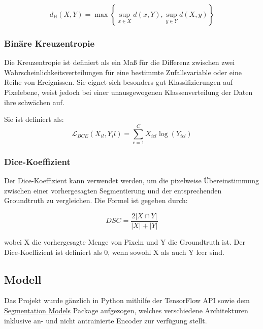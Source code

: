 \begin{equation}
d_{\mathrm{H}}(X, Y)=\max \left\{\sup _{x \in X} d(x, Y), \sup _{y \in Y} d(X, y)\right\}
\end{equation}

\subsubsection{Binäre Kreuzentropie} \label{ssec:bce}

Die Kreuzentropie ist definiert als ein Maß für die Differenz zwischen zwei Wahrscheinlichkeitsverteilungen für eine bestimmte Zufallsvariable oder eine Reihe von Ereignissen. Sie eignet sich besonders gut Klassifizierungen auf Pixelebene, weist jedoch bei einer unausgewogenen Klassenverteilung der Daten ihre schwächen auf. \citet{Jadon_2020} 

Sie ist definiert als:
\begin{equation}
\mathcal{L}_{BCE}\left(X_{i l}, Y_{i} l\right)=\sum_{c=1}^{C} X_{i c l} \log \left(Y_{i c l}\right)
\end{equation}

\subsubsection{Dice-Koeffizient} \label{ssec:dc}

Der Dice-Koeffizient kann verwendet werden, um die pixelweise Übereinstimmung zwischen einer vorhergesagten Segmentierung und der entsprechenden Groundtruth zu vergleichen. Die Formel ist gegeben durch:

\begin{equation}
D S C=\frac{2|X \cap Y|}{|X|+|Y|}
\end{equation}

wobei X die vorhergesagte Menge von Pixeln und Y die Groundtruth ist. Der Dice-Koeffizient ist definiert als 0, wenn sowohl X als auch Y leer sind.

\subsection{Modell}

Das Projekt wurde gänzlich in Python mithilfe der TensorFlow API sowie dem
 \href{https://deepai.org/machine-learning-glossary-and-terms/relu}{Segmentation Models} \citet{Yakubovskiy:2019}
 Package aufgezogen, welches verschiedene Architekturen inklusive an- und nicht antrainierte Encoder zur verfügung stellt. 
 
